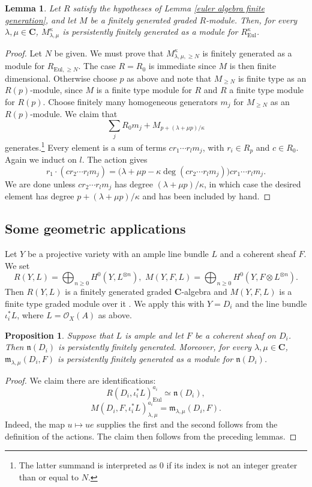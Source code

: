 \documentclass[12pt, oneside]{amsart}       %
\newtheorem{proposition}[theorem]{Proposition}
\newtheorem{lemma}[theorem]{Lemma}
\theoremstyle{remark}
\renewcommand{\geq}{\geqslant}
\newcommand{\OO}{\mathcal{O}}
\begin{document}
\begin{lemma}\label{eul mod fin gen} Let $R$ satisfy the hypotheses of Lemma \ref{euler algebra finite generation}, and let $M$ be a finitely generated graded $R$-module. Then, for every $\lambda,\mu\in\mathbf C$, $M^\kappa_{\lambda,\mu}$ is persistently finitely generated as a module for $R_{\mathrm{Eul}}^\kappa$.
\end{lemma}

\begin{proof} Let $N$ be given. We must prove that $M^\kappa_{\lambda,\mu,\geq N}$ is finitely generated as a module for $R_{\mathrm{Eul},\geq N}$. The case $R=R_0$ is immediate since $M$ is then finite dimensional. Otherwise choose $p$ as above and note that $M_{\geq N}$ is finite type as an $R(p)$-module, since $M$ is a finite type module for $R$ and $R$ a finite type module for $R(p)$. Choose finitely many homogeneous generators $m_j$ for $M_{\geq N}$ as an $R(p)$-module. We claim that
$$\sum_jR_0m_j+M_{p+(\lambda+\mu p)/\kappa}$$
generates.\footnote{The latter summand is interpreted as $0$ if its index is not an integer greater than or equal to $N$.} Every element is a sum of terms $cr_1\cdots r_lm_j$, with $r_i\in R_p$ and $c\in R_0$. Again we induct on $l$. The action gives
$$r_1\cdot(cr_2\cdots r_lm_j)=\big(\lambda+\mu p-\kappa\deg(cr_2\cdots r_lm_j)\big)cr_1\cdots r_lm_j.$$
We are done unless $cr_2\cdots r_lm_j$ has degree $(\lambda+\mu p)/\kappa$, in which case the desired element has degree $p+(\lambda+\mu p)/\kappa$ and has been included by hand.
\end{proof}

\subsection{Some geometric applications}

Let $Y$ be a projective variety with an ample line bundle $L$ and a coherent sheaf $F$. We set
$$R(Y,L)=\bigoplus_{n\geq0}H^0(Y,L^{\otimes n}),\,\,
M(Y,F,L)=\bigoplus_{n\geq0}H^0(Y,F\otimes L^{\otimes n}).$$
Then $R(Y,L)$ is a finitely generated graded $\mathbf C$-algebra and $M(Y,F,L)$ is a finite type graded module over it \cite[Tag 0B5T, Lemma 30.16.1(1), (5)]{Stacks}. We apply this with $Y=D_i$ and the line bundle $\iota_i^*L$, where $L=\OO_X(A)$ as above.

\begin{proposition}\label{norm fin gen} Suppose that $L$ is ample and let $F$ be a coherent sheaf on $D_i$. Then $\mathfrak{n}(D_i)$ is persistently finitely generated. Moreover, for every $\lambda,\mu\in\mathbf C$, $\mathfrak{m}_{\lambda,\mu}(D_i,F)$ is persistently finitely generated as a module for $\mathfrak{n}(D_i)$.
\end{proposition} \begin{proof} We claim there are identifications: $$R(D_i,\iota_i^*L)_{\mathrm{Eul}}^{a_i}\simeq\mathfrak{n}(D_i),$$ $$M(D_i,F,\iota_i^*L)_{\lambda,\mu}^{a_i}=\mathfrak{m}_{\lambda,\mu}(D_i,F).$$ Indeed, the map $u\mapsto ue$ supplies the first and the second follows from the definition of the actions. The claim then follows from the preceding lemmas.
\end{proof}
\end{document}
